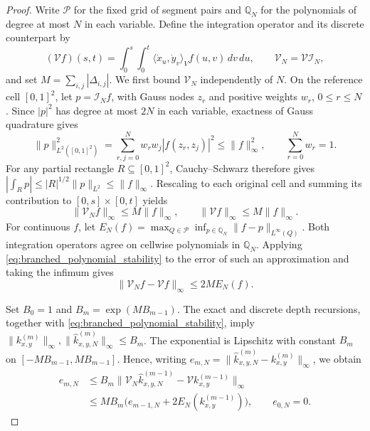 \begin{proof}
Write $\mathcal P$ for the fixed grid of segment pairs and $\mathbb Q_N$ for the polynomials of degree at most $N$ in each variable. Define the integration operator and its discrete counterpart by
\begin{equation*}
    (\mathcal V f)(s,t)
    =\int_0^s\int_0^t\langle\dot{x}_u,\dot{y}_v\rangle_V f(u,v)\,dv\,du,
    \qquad \mathcal V_N=\mathcal V\mathcal I_N,
\end{equation*}
and set $M=\sum_{i,j}|\Delta_{i,j}|$. We first bound $\mathcal V_N$ independently of $N$. On the reference cell $[0,1]^2$, let $p=\mathcal I_N f$, with Gauss nodes $z_r$ and positive weights $w_r$, $0\leq r\leq N$. Since $|p|^2$ has degree at most $2N$ in each variable, exactness of Gauss quadrature gives
\begin{equation*}
    \|p\|_{L^2([0,1]^2)}^2
    =\sum_{r,j=0}^N w_r w_j|f(z_r,z_j)|^2
    \leq\|f\|_\infty^2,
    \qquad \sum_{r=0}^N w_r=1.
\end{equation*}
For any partial rectangle $R\subseteq[0,1]^2$, Cauchy--Schwarz therefore gives $|\int_R p|\leq |R|^{1/2}\|p\|_{L^2}\leq\|f\|_\infty$. Rescaling to each original cell and summing its contribution to $[0,s]\times[0,t]$ yields
\begin{equation}
    \|\mathcal V_N f\|_\infty\leq M\|f\|_\infty,
    \qquad \|\mathcal V f\|_\infty\leq M\|f\|_\infty.
    \label{eq:branched_polynomial_stability}
\end{equation}
For continuous $f$, let $E_N(f)=\max_{Q\in\mathcal P}\inf_{p\in\mathbb Q_N}\|f-p\|_{L^\infty(Q)}$. Both integration operators agree on cellwise polynomials in $\mathbb Q_N$. Applying \eqref{eq:branched_polynomial_stability} to the error of such an approximation and taking the infimum gives
\begin{equation}
    \|\mathcal V_N f-\mathcal V f\|_\infty\leq 2M E_N(f).
    \label{eq:branched_polynomial_consistency}
\end{equation}

Set $B_0=1$ and $B_m=\exp(MB_{m-1})$. The exact and discrete depth recursions, together with \eqref{eq:branched_polynomial_stability}, imply $\|k_{x,y}^{(m)}\|_\infty,\|\widehat{k}_{x,y,N}^{(m)}\|_\infty\leq B_m$. The exponential is Lipschitz with constant $B_m$ on $[-MB_{m-1},MB_{m-1}]$. Hence, writing $e_{m,N}=\|\widehat{k}_{x,y,N}^{(m)}-k_{x,y}^{(m)}\|_\infty$, we obtain
\begin{align}
    e_{m,N}
    &\leq B_m\bigl\|\mathcal V_N\widehat{k}_{x,y,N}^{(m-1)}
                    -\mathcal V k_{x,y}^{(m-1)}\bigr\|_\infty\nonumber\\
    &\leq MB_m\bigl(e_{m-1,N}+2E_N(k_{x,y}^{(m-1)})\bigr),
    \qquad e_{0,N}=0.
    \label{eq:branched_polynomial_error_recursion}
\end{align}


\end{proof}
